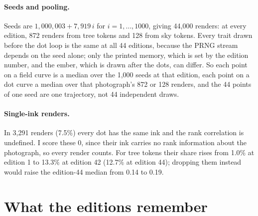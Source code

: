 \documentclass[11pt]{article}
\begin{document}
\paragraph{Seeds and pooling.} Seeds are $1{,}000{,}003 + 7{,}919\,i$ for $i = 1,\ldots,1000$, giving 44{,}000 renders: at every edition, 872 renders from tree tokens and 128 from sky tokens. Every trait drawn before the dot loop is the same at all 44 editions, because the PRNG stream depends on the seed alone; only the printed memory, which is set by the edition number, and the ember, which is drawn after the dots, can differ. So each point on a field curve is a median over the 1{,}000 seeds at that edition, each point on a dot curve a median over that photograph's 872 or 128 renders, and the 44 points of one seed are one trajectory, not 44 independent draws.

\paragraph{Single-ink renders.} In 3{,}291 renders (7.5\%) every dot has the same ink and the rank correlation is undefined. I score these 0, since their ink carries no rank information about the photograph, so every render counts. For tree tokens their share rises from 1.0\% at edition 1 to 13.3\% at edition 42 (12.7\% at edition 44); dropping them instead would raise the edition-44 median from 0.14 to 0.19.

\section{What the editions remember}
\label{sec:measure}
\end{document}
